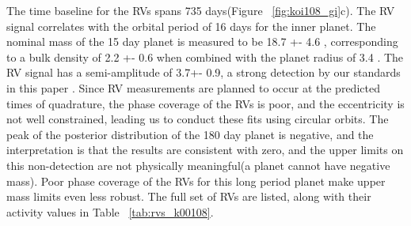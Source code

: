 \documentclass{emulateapj}
\begin{document}
The time baseline for the RVs spans 735 days(Figure ~\ref{fig:koi108_gi}c). The RV signal correlates with the orbital period of 16 days for the inner planet. The nominal mass of the 15 day planet is measured to be 18.7 +- 4.6 \mearthe, corresponding to a bulk density of 2.2 +- 0.6 \gcc when combined with the planet radius of 3.4 \rearth. The RV signal has a semi-amplitude of 3.7+- 0.9\ms, a strong detection by our standards in this paper . Since RV measurements are planned to occur at the predicted times of quadrature, the phase coverage of the RVs is poor, and the eccentricity is not well constrained, leading us to conduct these fits using circular orbits.  The peak of the posterior distribution of the 180 day planet is  negative, and the interpretation is that the results are consistent with zero, and the upper limits on this non-detection are not physically meaningful(a planet cannot have negative mass). Poor phase coverage of the RVs for this long period planet make upper mass limits even less robust. 
The full set of RVs are listed, along with their \rphk~ activity values in Table ~\ref{tab:rvs_k00108}.






\subsection{\koioneonesix}  %
\end{document}

